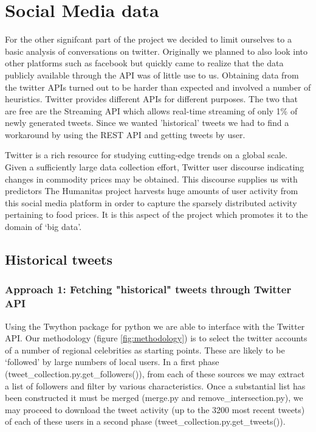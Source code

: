 
\section*{Social Media data}
For the other signifcant part of the project we decided to limit ourselves to a basic analysis of conversations on twitter. Originally we planned to also look into other platforms such as facebook but quickly came to realize that the data publicly available through the API was of little use to us. Obtaining data from the twitter APIs turned out to be harder than expected and involved a number of heuristics. Twitter provides different APIs for different purposes. The two that are free are the Streaming API which allows real-time streaming of only 1\% of newly generated tweets. Since we wanted 'historical' tweets we had to find a workaround by using the REST API and getting tweets by user.\par
Twitter is a rich resource for studying cutting-edge trends on a global scale. Given a sufficiently large data collection effort, Twitter user discourse indicating changes in commodity prices may be obtained. This discourse supplies us with predictors The Humanitas project harvests huge amounts of user activity from this social media platform in order to capture the sparsely distributed activity pertaining to food prices. It is this aspect of the project which promotes it to the domain of `big data'.

\subsection*{Historical tweets}

\subsubsection*{Approach 1: Fetching "historical" tweets through Twitter API}

Using the Twython package for python we are able to interface with the Twitter API. Our methodology (figure \ref{fig:methodology}) is to select the twitter accounts of a number of regional celebrities as starting points. These are likely to be `followed' by large numbers of local users. In a first phase (tweet\_collection.py.get\_followers()), from each of these sources we may extract a list of followers and filter by various characteristics. Once a substantial list has been constructed it must be merged (merge.py and remove\_intersection.py), we may proceed to download the tweet activity (up to the 3200 most recent tweets) of each of these users in a second phase (tweet\_collection.py.get\_tweets()).

